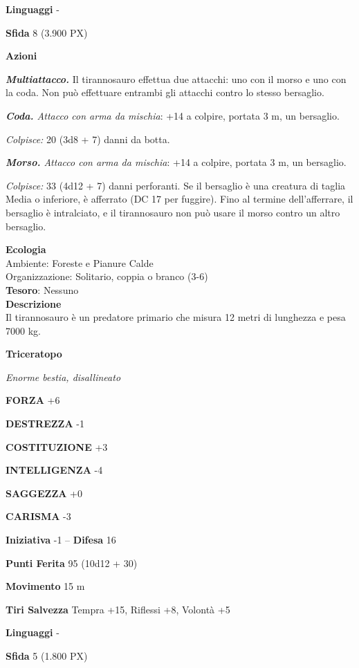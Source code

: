 \begin{multicols}{2}
	\textbf{Linguaggi} -

	\textbf{Sfida} 8 (3.900 PX)

	\textbf{Azioni}

	\textit{\textbf{Multiattacco.}} Il tirannosauro effettua due attacchi: uno con il morso e uno con la coda. Non può effettuare entrambi gli attacchi contro lo stesso bersaglio.

	\textit{\textbf{Coda.} Attacco con arma da mischia}: +14 a colpire, portata 3 m, un bersaglio.

	\textit{Colpisce:} 20 (3d8 + 7) danni da botta.

	\textit{\textbf{Morso.} Attacco con arma da mischia}: +14 a colpire, portata 3 m, un bersaglio.

	\textit{Colpisce:} 33 (4d12 + 7) danni perforanti. Se il bersaglio è una creatura di taglia Media o inferiore, è afferrato (DC 17 per fuggire). Fino al termine dell'afferrare, il bersaglio è intralciato, e il tirannosauro non può usare il morso contro un altro bersaglio.

	\textbf{Ecologia}\\
	Ambiente: Foreste e Pianure Calde\\
	Organizzazione: Solitario, coppia o branco (3-6)\\
	\textbf{Tesoro}: Nessuno\\
	\textbf{Descrizione}\\
	Il tirannosauro è un predatore primario che misura 12 metri di lunghezza e pesa 7000 kg.


	\medskip{}\textbf{Triceratopo}

	\textit{Enorme bestia, disallineato}

	\textbf{FORZA} +6

	\textbf{DESTREZZA} -1

	\textbf{COSTITUZIONE} +3

	\textbf{INTELLIGENZA} -4

	\textbf{SAGGEZZA} +0

	\textbf{CARISMA} -3

	\textbf{Iniziativa} -1 -- \textbf{Difesa} 16

	\textbf{Punti Ferita} 95 (10d12 + 30)

	\textbf{Movimento} 15 m

	\textbf{Tiri Salvezza} Tempra +15, Riflessi +8, Volontà +5

	\textbf{Linguaggi} -

	\textbf{Sfida} 5 (1.800 PX)


\end{multicols}
